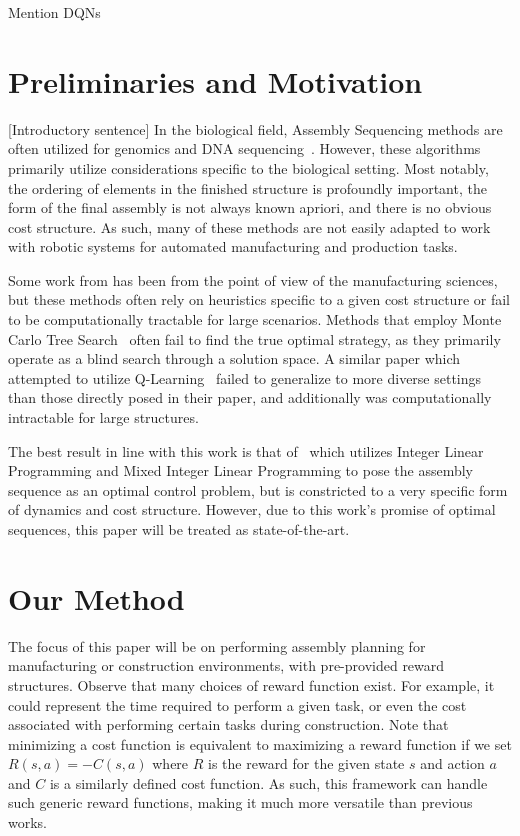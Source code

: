 \documentclass{article}
\begin{document}
Mention DQNs
\color{black}


\section{Preliminaries and Motivation}
{\color{red}[Introductory sentence]} In the biological field, Assembly Sequencing methods are often  utilized for genomics and DNA sequencing~\citep{Miller2010}\citep{Dohm2007}\citep{WarnkeSommer2016}. However, these algorithms primarily  utilize considerations specific to the biological setting. Most notably, the ordering of elements in the finished structure is profoundly important, the form of the final assembly is not always known apriori, and there is no obvious cost structure. As such, many of these methods are not easily adapted to work with robotic systems for automated manufacturing and production tasks.

Some work from has been from the point of view of the manufacturing sciences, but these methods often rely on heuristics specific to a given cost structure or fail to be computationally tractable for large scenarios. Methods that employ Monte Carlo Tree Search~\citep{Giorgio2018a} often fail to find the true optimal strategy, as they primarily operate as a blind search through a solution space. A similar paper which attempted to utilize Q-Learning~\citep{Giorgio2018} failed to generalize to more diverse settings than those directly posed in their paper, and additionally was computationally intractable for large structures.

The best result in line with this work is that of~\citep{Culbertson2019} which utilizes Integer Linear Programming and Mixed Integer Linear Programming to pose the assembly sequence as an optimal control problem, but is constricted to a very specific form of dynamics and cost structure. However, due to this work's promise of optimal sequences, this paper will be treated as state-of-the-art.



\section{Our Method}
The focus of this paper will be on performing assembly planning for manufacturing or construction environments, with pre-provided reward structures. Observe that many choices of reward function exist. For example, it could represent the time required to perform a given task, or even the cost associated with performing certain tasks during construction. Note that minimizing a cost function is equivalent to maximizing a reward function if we set $R(s,a) = -C(s,a)$ where $R$ is the reward for the given state $s$ and action $a$ and $C$ is a similarly defined cost function. As such, this framework can handle such generic reward functions, making it much more versatile than previous works.
\end{document}
